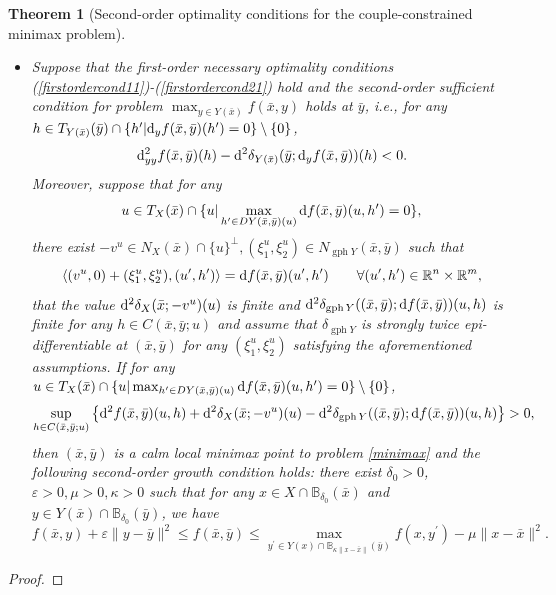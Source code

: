 \documentclass[11pt]{article}
\numberwithin{equation}{section}
\newtheorem{theorem}{Theorem}[section]
\begin{document}
{\begin{theorem}[Second-order optimality conditions for the couple-constrained minimax problem]
\begin{itemize}
\item[(b)] Suppose that the first-order necessary optimality conditions (\ref{firstordercond11})-(\ref{firstordercond21})  hold and the second-order sufficient condition for  problem $\max_{y\in Y(\bar x)} f(\bar x, y)$ holds at $\bar y$, i.e., for any $h\in T_{ Y(\bar x)}(\bar y) \cap \{h'|{\rm d}_y f(\bar x,\bar y)(h') =  0\} \setminus \{0\}$,
\begin{equation}\label{sufflower}
{\rm d}^2_{yy} f(\bar x,\bar y)(h) -{\rm d}^2 \delta_{Y(\bar x)}(\bar y;{\rm d}_yf(\bar x,\bar y))(h)<0.
\end{equation}
Moreover, suppose  that for any $$u\in  T_{ X}(\bar x) \cap \{u|\max_{h'\in DY(\bar x,\bar y)(u)}{\rm d} f(\bar x,\bar y)(u,h') =  0\},$$ there exist $-v^u\in N_X(\bar x)\cap \{u\}^\perp, (\xi_1^u,\xi_2^u) \in N_{\operatorname{gph}Y}(\bar x,\bar y)$ such that  $$\langle (v^u,0)+(\xi_1^u,\xi_2^u), (u',h') \rangle = {\rm d} f(\bar x,\bar y)(u',h') \qquad \forall (u',h') \in \mathbb{R}^n \times \mathbb{R}^m,$$  that the value ${\rm d}^2 \delta_X(\bar x;-v^u)(u)$ is finite and ${\rm d}^2 \delta_{\operatorname{gph}Y}((\bar x,\bar y);{\rm d}f(\bar x,\bar y))(u,h)$ is finite for any $h \in C(\bar x,\bar y;u)$ and  assume that \( \delta_{\operatorname{gph} Y} \) is strongly twice epi-differentiable at \( (\bar{x}, \bar{y}) \) for any  \( (\xi_1^u, \xi_2^u) \) satisfying the aforementioned assumptions.
If for any $u\in  T_{ X}(\bar x) \cap \{u|\max_{h'\in DY(\bar x,\bar y)(u)}{\rm d} f(\bar x,\bar y)(u,h') =  0\} \setminus \{0\}$, 
\begin{equation}\label{cxlower3-non-new1}
\sup_{h \in C(\bar x,\bar y;u)}  \left\{ {\rm d}^2 f(\bar x,\bar y)(u,h) + {\rm d}^2 \delta_X(\bar x;-v^u)(u) -{\rm d}^2 \delta_{\operatorname{gph}Y}((\bar x,\bar y);{\rm d}f(\bar x,\bar y))(u,h) \right\} >0,
\end{equation}
then $(\bar x,\bar y)$ is a calm local minimax point to problem \eqref{minimax} and  the  following second-order growth condition holds: there exist $\delta_0>0$,   $\varepsilon>0, \mu > 0, \kappa>0$
 such that  for any $x \in X \cap \mathbb{B}_{\delta_0}(\bar x)$ and $y \in Y(\bar x)\cap \mathbb{B}_{\delta_0}(\bar y)$, we have
\begin{equation*}
f(\bar x, y)+\varepsilon\|y-\bar y\|^2  \leq f(\bar x, \bar y) \leq  \max _{y^{\prime}  \in  Y(x)\cap \mathbb{B}_{\kappa\|x-\bar x\|}(\bar y)} f(x, y^{\prime}) - \mu \|x-\bar x\|^2.
\end{equation*}
\end{itemize}
\end{theorem}
\begin{proof}


\end{proof}}
\end{document}
